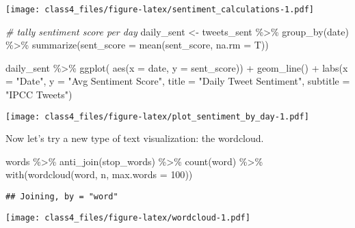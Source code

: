 \documentclass[
]{article}
\newenvironment{Shaded}{\begin{snugshade}}{\end{snugshade}}
\newcommand{\AttributeTok}[1]{\textcolor[rgb]{0.77,0.63,0.00}{#1}}
\newcommand{\CommentTok}[1]{\textcolor[rgb]{0.56,0.35,0.01}{\textit{#1}}}
\newcommand{\DecValTok}[1]{\textcolor[rgb]{0.00,0.00,0.81}{#1}}
\newcommand{\FunctionTok}[1]{\textcolor[rgb]{0.00,0.00,0.00}{#1}}
\newcommand{\NormalTok}[1]{#1}
\newcommand{\OtherTok}[1]{\textcolor[rgb]{0.56,0.35,0.01}{#1}}
\newcommand{\SpecialCharTok}[1]{\textcolor[rgb]{0.00,0.00,0.00}{#1}}
\newcommand{\StringTok}[1]{\textcolor[rgb]{0.31,0.60,0.02}{#1}}
\begin{document}
\texttt{[image: class4\_files/figure-latex/sentiment\_calculations-1.pdf]}

\begin{Shaded}
\begin{Highlighting}[]
\CommentTok{\# tally sentiment score per day}
\NormalTok{daily\_sent }\OtherTok{\textless{}{-}}\NormalTok{ tweets\_sent }\SpecialCharTok{\%\textgreater{}\%}
  \FunctionTok{group\_by}\NormalTok{(date) }\SpecialCharTok{\%\textgreater{}\%}
  \FunctionTok{summarize}\NormalTok{(}\AttributeTok{sent\_score =} \FunctionTok{mean}\NormalTok{(sent\_score, }\AttributeTok{na.rm =}\NormalTok{ T))}

\NormalTok{daily\_sent }\SpecialCharTok{\%\textgreater{}\%}
  \FunctionTok{ggplot}\NormalTok{( }\FunctionTok{aes}\NormalTok{(}\AttributeTok{x =}\NormalTok{ date, }\AttributeTok{y =}\NormalTok{ sent\_score)) }\SpecialCharTok{+}
  \FunctionTok{geom\_line}\NormalTok{() }\SpecialCharTok{+}
    \FunctionTok{labs}\NormalTok{(}\AttributeTok{x =} \StringTok{"Date"}\NormalTok{,}
    \AttributeTok{y =} \StringTok{"Avg Sentiment Score"}\NormalTok{,}
    \AttributeTok{title =} \StringTok{"Daily Tweet Sentiment"}\NormalTok{,}
    \AttributeTok{subtitle =} \StringTok{"IPCC Tweets"}\NormalTok{)}
\end{Highlighting}
\end{Shaded}

\texttt{[image: class4\_files/figure-latex/plot\_sentiment\_by\_day-1.pdf]}

Now let's try a new type of text visualization: the wordcloud.

\begin{Shaded}
\begin{Highlighting}[]
\NormalTok{words }\SpecialCharTok{\%\textgreater{}\%}
   \FunctionTok{anti\_join}\NormalTok{(stop\_words) }\SpecialCharTok{\%\textgreater{}\%}
   \FunctionTok{count}\NormalTok{(word) }\SpecialCharTok{\%\textgreater{}\%}
   \FunctionTok{with}\NormalTok{(}\FunctionTok{wordcloud}\NormalTok{(word, n, }\AttributeTok{max.words =} \DecValTok{100}\NormalTok{))}
\end{Highlighting}
\end{Shaded}

\begin{verbatim}
## Joining, by = "word"
\end{verbatim}

\texttt{[image: class4\_files/figure-latex/wordcloud-1.pdf]}
\end{document}

